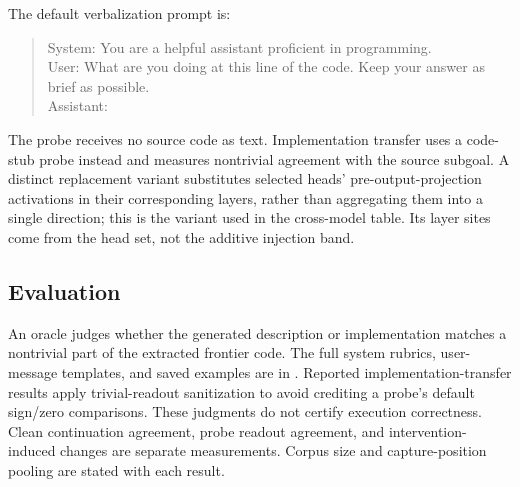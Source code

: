 The default verbalization prompt is:
\begin{quote}\small
System: You are a helpful assistant proficient in programming.\\
User: What are you doing at this line of the code. Keep your answer as brief as possible.\\
Assistant:
\end{quote}
The probe receives no source code as text. Implementation transfer uses a code-stub probe instead and measures nontrivial agreement with the source subgoal. A distinct replacement variant substitutes selected heads' pre-output-projection activations in their corresponding layers, rather than aggregating them into a single direction; this is the variant used in the cross-model table. Its layer sites come from the head set, not the additive injection band.

\subsection{Evaluation}
An oracle judges whether the generated description or implementation matches a nontrivial part of the extracted frontier code. The full system rubrics, user-message templates, and saved examples are in . Reported implementation-transfer results apply trivial-readout sanitization to avoid crediting a probe's default sign/zero comparisons. These judgments do not certify execution correctness. Clean continuation agreement, probe readout agreement, and intervention-induced changes are separate measurements. Corpus size and capture-position pooling are stated with each result.
